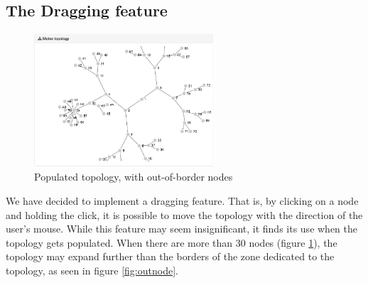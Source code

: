 \subsection*{The Dragging feature}

\begin{figure}
	\centering
	\includegraphics[width=0.6\textwidth]{res/populated.png}
	\caption{Populated topology, with out-of-border nodes}
	\label{fig:populated}
\end{figure}


We have decided to implement a dragging feature. That is, by clicking on a node and holding the click, it is possible to move the topology with the direction of the user's mouse. While this feature may seem insignificant, it finds its use when the topology gets populated. When there are more than 30 nodes (figure \ref{fig:populated}), the topology may expand further than the borders of the zone dedicated to the topology, as seen in figure \ref{fig:outnode}.\\



